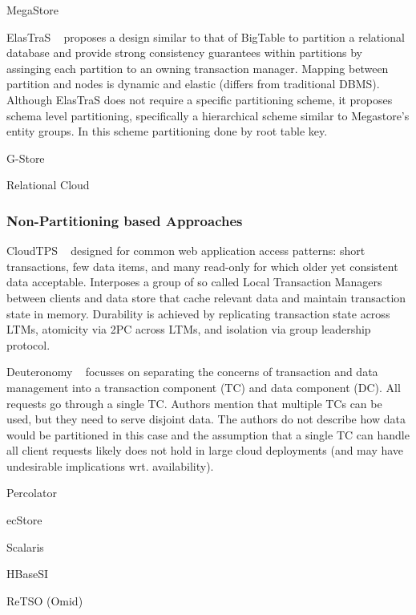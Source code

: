 \documentclass[10pt,final,journal]{IEEEtran}
\begin{document}
MegaStore ~\cite{Furman:2008:8530095, Baker:2011:8530095}

ElasTraS ~\cite{Das:2009:EET:1855533.1855540, Das:2010:EAE} proposes a design similar to that of BigTable to partition a relational database and provide strong consistency guarantees within partitions by assinging each partition to an owning transaction manager. Mapping between partition and nodes is dynamic and elastic (differs from traditional DBMS). Although ElasTraS does not require a specific partitioning scheme, it proposes schema level partitioning, specifically a hierarchical scheme similar to Megastore's entity groups. In this scheme partitioning done by root table key.

G-Store ~\cite{Das:2010:GSD:1807128.1807157}

Relational Cloud ~\cite{Curino:2011:JPMWMBZ11}

\subsubsection{Non-Partitioning based Approaches}
CloudTPS ~\cite{Zhou:2011:5740834} designed for common web application access patterns: short transactions, few data items, and many read-only for which older yet consistent data acceptable. Interposes a group of so called Local Transaction Managers between clients and data store that cache relevant data and maintain transaction state in memory. Durability is achieved by replicating transaction state across LTMs, atomicity via 2PC across LTMs, and isolation via group leadership protocol.

Deuteronomy ~\cite{Levandoski:2011:8530161} focusses on separating the concerns of transaction and data management into a transaction component (TC) and data component (DC). All requests go through a single TC. Authors mention that multiple TCs can be used, but they need to serve disjoint data. The authors do not describe how data would be partitioned in this case and the assumption that a single TC can handle all client requests likely does not hold in large cloud deployments (and may have undesirable implications wrt. availability).

Percolator ~\cite{Peng:2010:LIP:1924943.1924961}

ecStore ~\cite{}

Scalaris 

HBaseSI

ReTSO (Omid)
\end{document}
